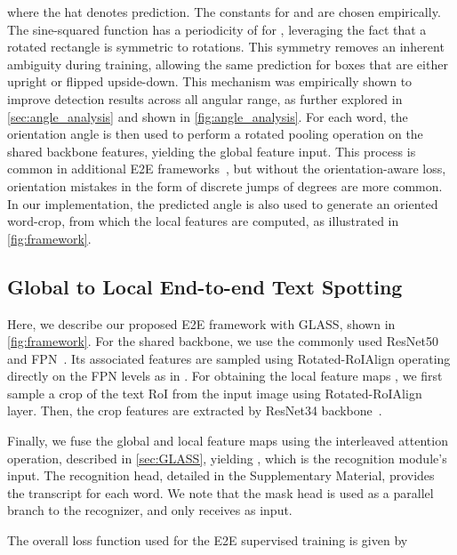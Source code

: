 \documentclass[runningheads]{llncs}
\begin{document}
where the hat denotes prediction.
The constants  for  and  are chosen empirically.
The sine-squared function has a periodicity of  for , leveraging the fact that a rotated rectangle is symmetric to  rotations.
This symmetry removes an inherent ambiguity during training, allowing the same prediction for boxes that are either upright or flipped upside-down.
This mechanism was empirically shown to improve detection results across all angular range, as further explored in \cref{sec:angle_analysis} and shown in \cref{fig:angle_analysis}.
For each word, the orientation angle is then used to perform a rotated pooling operation on the shared backbone features, yielding the global feature input.
This process is common in additional E2E frameworks~\cite{liu2021abcnetV2,liao2020spotterV3}, but without the orientation-aware loss, orientation mistakes in the form of discrete jumps of  degrees are more common.
In our implementation, the predicted angle is also used to generate an  oriented word-crop, from which the local features are computed, as illustrated in \cref{fig:framework}.











\subsection{Global to Local End-to-end Text Spotting}
\label{sec:e2e}
Here, we describe our proposed E2E framework 
with GLASS, shown in \cref{fig:framework}.
For the shared backbone, we use the commonly used ResNet50 and FPN~\cite{lin2017feature}.
Its associated features  are sampled using Rotated-RoIAlign
operating directly on the FPN levels as in \cite{qin2019towards}.
For obtaining the local feature maps , we first sample a crop of the text RoI from the input image using Rotated-RoIAlign layer.
Then, the crop features are extracted by  ResNet34 backbone~\cite{focusing_att2017}.

Finally, we fuse the global and local feature maps using the interleaved attention operation, described in \cref{sec:GLASS}, yielding , which is the recognition module's input.
The recognition head, detailed in the Supplementary Material, provides the transcript for each word.
We note that the mask head is used as a parallel branch to the recognizer, and only receives  as input.

The overall loss function  used for the E2E supervised training is given by
\end{document}
